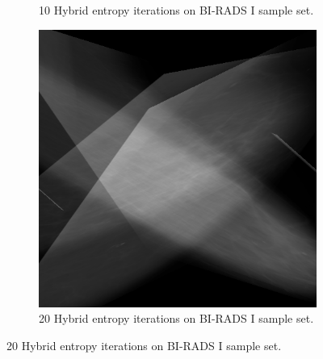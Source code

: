 \begin{figure}[H]
\begin{subfigure}[t]{0.3\textwidth}
        \caption{10 Hybrid entropy iterations on BI-RADS I sample set.}
        \label{fig:10-hybrid}
    \end{subfigure} \hfill
    \begin{subfigure}[t]{0.3\textwidth}
      \includegraphics[width=\textwidth]{Chapter3/hybrid-img/hybrid20.png}
      \caption{20 Hybrid entropy iterations on BI-RADS I sample set.}
      \label{fig:20-hybrid}
    \end{subfigure}
\end{figure}

